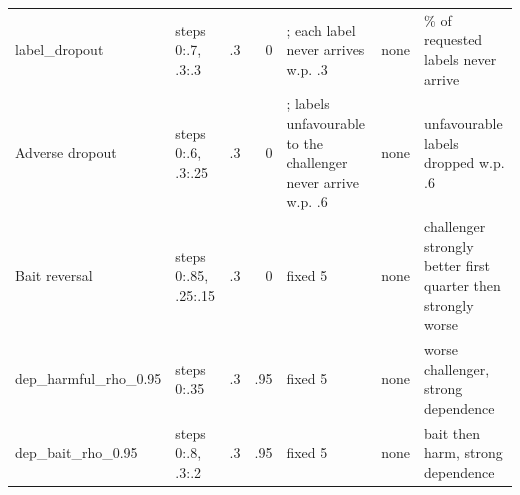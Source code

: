 \begin{longtable}{@{}>{\raggedright\arraybackslash}p{3.3cm}>{\raggedright\arraybackslash}p{2.9cm}rr>{\raggedright\arraybackslash}p{2.4cm}>{\raggedright\arraybackslash}p{1.1cm}>{\raggedright\arraybackslash}p{2.7cm}@{}}
label\_dropout & steps 0:.7, .3:.3 & .3 & 0 & 5; each label never arrives w.p. .3 & none & 30\% of requested labels never arrive \\
Adverse dropout & steps 0:.6, .3:.25 & .3 & 0 & 5; labels unfavourable to the challenger never arrive w.p. .6 & none & unfavourable labels dropped w.p. .6 \\
Bait reversal & steps 0:.85, .25:.15 & .3 & 0 & fixed 5 & none & challenger strongly better first quarter then strongly worse \\
dep\_harmful\_rho\_0.95 & steps 0:.35 & .3 & .95 & fixed 5 & none & worse challenger, strong dependence \\
dep\_bait\_rho\_0.95 & steps 0:.8, .3:.2 & .3 & .95 & fixed 5 & none & bait then harm, strong dependence \\
\bottomrule
\end{longtable}

